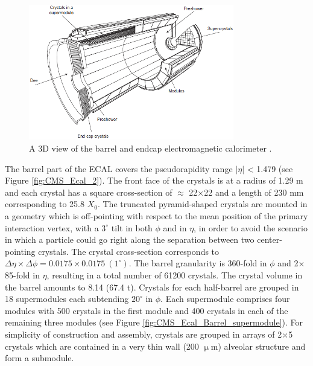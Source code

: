 \begin{figure}[h!]
\begin{center}
\includegraphics[width=0.8\textwidth]{figures/CMS/ECAL/ECAL.png}
\caption{A 3D view of the barrel and endcap electromagnetic calorimeter \cite{Chatrchyan:2008aa}.}
\label{fig:CMS_Ecal_1}
\end{center}
\end{figure}

The barrel part of the ECAL covers the pseudorapidity range $|\eta|$ < 1.479 (see Figure \ref{fig:CMS_Ecal_2}). The front face of the crystals is at a radius of 1.29 m and each crystal has a square cross-section of $\approx$ 22$\times$22 \mmTwo and a length of 230 mm corresponding to 25.8 $X_{0}$. The truncated pyramid-shaped crystals are mounted in a geometry which is off-pointing with respect to the mean position of the primary interaction vertex, with a $3^{\circ}$ tilt in both $\phi$ and in $\eta$, in order to avoid the scenario in which a particle could go right along the separation between two center-pointing crystals. The crystal cross-section corresponds to $\Delta\eta\times\Delta\phi=0.0175\times0.0175~(1^{\circ})$. The barrel granularity is 360-fold in $\phi$ and 2$\times$85-fold in $\eta$, resulting in a total number of 61200 crystals. The crystal volume in the barrel amounts to 8.14 \mThree (67.4 t). Crystals for each half-barrel are grouped in 18 supermodules each subtending $20^{\circ}$ in
$\phi$. Each supermodule comprises four modules with 500 crystals in the first module and 400 crystals in each of the remaining three modules (see Figure \ref{fig:CMS_Ecal_Barrel_supermodule}). For simplicity of construction and assembly, crystals are grouped in arrays of 2$\times$5 crystals which are contained in a very thin wall (200 $\upmu$m) alveolar structure and form a submodule.


